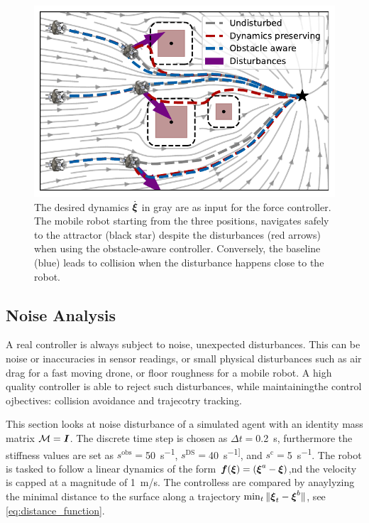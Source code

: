\begin{figure}
  \centering
  \centerline{\includegraphics[width=0.95\columnwidth]{figures/multi_obstacle_with_damping.pdf}}
  \caption{The desired dynamics $\dot{\boldsymbol{\xi}}$ in gray are as input for the force controller. 
  The mobile robot starting from the three positions, navigates safely to the attractor (black star) despite the disturbances (red arrows) when using the obstacle-aware controller.
  Conversely, the baseline (blue) leads to collision when the disturbance happens close to the robot.}
  \label{fig:obstacle_aware_damping_comparison}
\end{figure}

\subsection{Noise Analysis}
A real controller is always subject to noise, unexpected disturbances. This can be noise or inaccuracies in sensor readings, or small physical disturbances such as air drag for a fast moving drone, or floor roughness for a mobile robot. 
A high quality controller is able to reject such disturbances, while maintainingthe control ojbectives: collision avoidance and trajecotry tracking. 

This section looks at noise disturbance of a simulated agent with an identity mass matrix $\mathcal{M} = \boldsymbol{I}$. The discrete time step is chosen as $\Delta t = $\qty{0.2}{s}, furthermore the stiffness values are set as
$s^{\mathrm{obs}}=$\qty{50}{s^{-1}},
$s^{\mathrm{DS}}=$\qty{40}{s^{-1]}}, and
$s^{\mathrm{c}}=$\qty{5}{s^{-1}}.
 The robot is tasked to follow a linear dynamics of  the form $\boldsymbol{f}(\boldsymbol{\xi}) = (\boldsymbol{\xi}^a -  \boldsymbol{\xi})$,nd the velocity is capped at a magnitude of \qty{1}{m/s}. 
 The controlless are compared by anaylyzing the minimal distance to the surface along a trajectory $ \min_t \| \boldsymbol{\xi}_t - \boldsymbol{\xi}^b \| $, see \eqref{eq:distance_function}.


